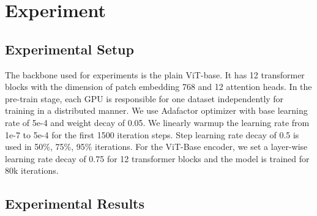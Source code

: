 \documentclass[10pt,twocolumn,letterpaper]{article}
\begin{document}
\section{Experiment} \label{sec:exp}

\subsection{Experimental Setup}
The backbone used for experiments is the plain ViT-base. It has 12 transformer blocks with the dimension of patch embedding 768 and 12 attention heads. In the pre-train stage, each GPU is responsible for one dataset independently for training in a distributed manner. We use Adafactor\cite{shazeer2018adafactor} optimizer with base learning rate of 5e-4 and weight decay of 0.05. We linearly warmup the learning rate from 1e-7 to 5e-4 for the first 1500 iteration steps. Step learning rate decay of 0.5 is used in 50\%, 75\%, 95\% iterations. For the ViT-Base encoder, we set a layer-wise learning rate decay of 0.75 for 12 transformer blocks and the model is trained for 80k iterations.


\subsection{Experimental Results}






    
\end{document}
